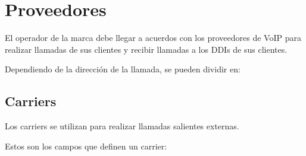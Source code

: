 \documentclass[letterpaper,10pt,spanish]{sphinxmanual}
\begin{document}
\section{Proveedores}
\label{administration_portal/brand/providers/index::doc}\label{administration_portal/brand/providers/index:providers}
El operador de la marca debe llegar a acuerdos con los proveedores de VoIP para realizar llamadas de sus clientes y recibir llamadas a los DDIs de sus clientes.

Dependiendo de la dirección de la llamada, se pueden dividir en:


\subsection{Carriers}
\label{administration_portal/brand/providers/carriers:id1}\label{administration_portal/brand/providers/carriers::doc}\label{administration_portal/brand/providers/carriers:carriers}
Los carriers se utilizan para realizar llamadas salientes externas.

Estos son los campos que definen un carrier:
\end{document}
